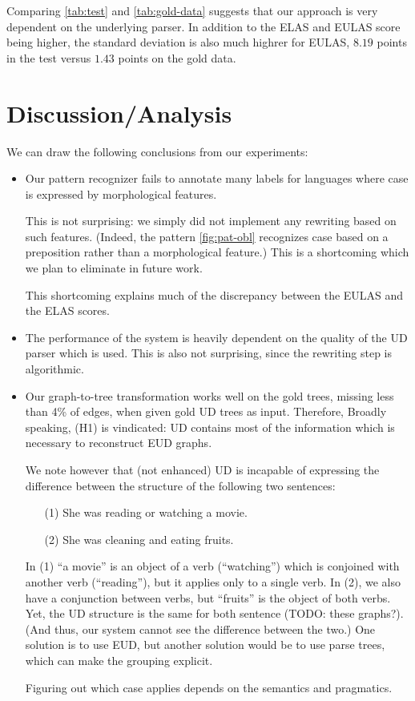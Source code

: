 \documentclass[11pt,a4paper]{article}
\begin{document}
Comparing \cref{tab:test} and \cref{tab:gold-data} suggests
that our approach is very dependent on the underlying parser. In
addition to the ELAS and EULAS score being higher, the standard
deviation is also much highrer for EULAS, $8.19$ points in the test
versus $1.43$ points on the gold data.

\section{Discussion/Analysis}

We can draw the following conclusions from our experiments:

\begin{itemize}
\item
  Our pattern recognizer fails to annotate many labels
  for languages where case is expressed by morphological features.
  
  This is not surprising: we simply did not implement any rewriting
  based on such features. (Indeed, the pattern \cref{fig:pat-obl}
  recognizes case based on a preposition rather than a morphological
  feature.) This is a shortcoming which we plan to eliminate in future
  work.

  This shortcoming explains much of the discrepancy between the EULAS
  and the ELAS scores.
\item The performance of the system is heavily dependent on the
  quality of the UD parser which is used. This is also not surprising,
  since the rewriting step is algorithmic.

\item Our graph-to-tree transformation works well on the gold trees,
  missing less than 4\% of edges, when given gold UD trees as input.
  Therefore, Broadly speaking, (H1) is vindicated: UD contains most of
  the information which is necessary to reconstruct EUD graphs.

  We note however that (not enhanced) UD is incapable of expressing
  the difference between the structure of the following two sentences:
  
  \begin{itemize}
  \item[(1)] She was reading or watching a movie.
  \item[(2)] She was cleaning and eating fruits.
  \end{itemize}
  In (1) ``a movie'' is an object of a verb (``watching'') which is
  conjoined with another verb (``reading''), but it applies only to a
  single verb. In (2), we also have a conjunction between verbs, but
  ``fruits'' is the object of both verbs. Yet, the UD structure is the
  same for both sentence (TODO: these graphs?).  (And thus, our system
  cannot see the difference between the two.)  One solution is to use
  EUD, but another solution would be to use parse trees, which can
  make the grouping explicit.

  Figuring out which case applies depends on the semantics and
  pragmatics.

\end{itemize}
\end{document}
